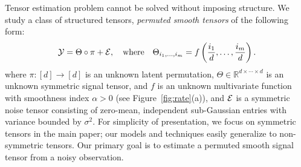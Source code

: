 \documentclass{article}
\theoremstyle{definition}
\begin{document}
Tensor estimation problem cannot be solved without imposing structure. 
We study a class of structured tensors, \emph{permuted smooth tensors} of the following form:
\begin{equation}\label{eq:rep}
\mathcal{Y}=\Theta\circ \pi+\mathcal{E},\quad\text{where}\quad \Theta_{i_1,\ldots,i_m} = f\left({i_1\over d},\ldots,{i_m\over d}\right).
\end{equation}
where $\pi\colon[d]\rightarrow[d]$ is an unknown latent permutation,  $\Theta\in \mathbb{R}^{d\times \cdots\times d}$ is an unknown symmetric signal tensor, and $f$ is an unknown multivariate function with smoothness index $\alpha>0$ (see Figure~\ref{fig:rate}(a)), and $\mathcal{E}$ is a symmetric noise tensor consisting of zero-mean, independent sub-Gaussian entries with variance bounded by $\sigma^2$. For simplicity of presentation, we focus on symmetric tensors in the main paper; our models and techniques easily generalize to non-symmetric tensors.  Our primary goal is to estimate a permuted smooth signal tensor from a noisy observation. 
\end{document}
